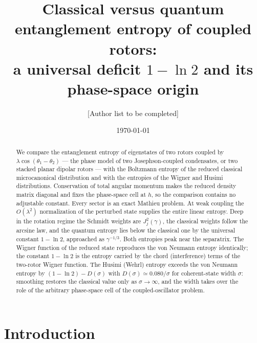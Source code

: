 \documentclass[pra,twocolumn,superscriptaddress,longbibliography,floatfix]{revtex4-2}
\begin{document}
\title{Classical versus quantum entanglement entropy of coupled rotors:\\
a universal deficit $1-\ln2$ and its phase-space origin}

\author{[Author list to be completed]}
\affiliation{[Affiliation]}

\date{\today}

\begin{abstract}
We compare the entanglement entropy of eigenstates of two rotors coupled by
$\lambda\cos(\theta_{1}-\theta_{2})$ --- the phase model of two
Josephson-coupled condensates, or two stacked planar dipolar rotors --- with
the Boltzmann entropy of the reduced classical microcanonical distribution and
with the entropies of the Wigner and Husimi distributions. Conservation of total
angular momentum makes the reduced density matrix diagonal and fixes the
phase-space cell at $h$, so the comparison contains no adjustable constant.
Every sector is an exact Mathieu problem. At weak coupling the $O(\lambda^{2})$
normalization of the perturbed state supplies the entire linear entropy. Deep in
the rotation regime the Schmidt weights are $J_{j}^{2}(\gamma)$, the classical
weights follow the arcsine law, and the quantum entropy lies below the classical
one by the universal constant $1-\ln2$, approached as $\gamma^{-1/3}$. Both
entropies peak near the separatrix. The Wigner function of the reduced state
reproduces the von Neumann entropy identically; the constant $1-\ln2$ is the
entropy carried by the chord (interference) terms of the two-rotor Wigner
function. The Husimi (Wehrl) entropy exceeds the von Neumann entropy by
$(1-\ln2)-D(\sigma)$ with $D(\sigma)\simeq0.080/\sigma$ for coherent-state
width $\sigma$: smoothing restores the classical value only as $\sigma\to\infty$,
and the width takes over the role of the arbitrary phase-space cell of the
coupled-oscillator problem.
\end{abstract}

\maketitle

\section{Introduction}
\label{sec:intro}
\end{document}
